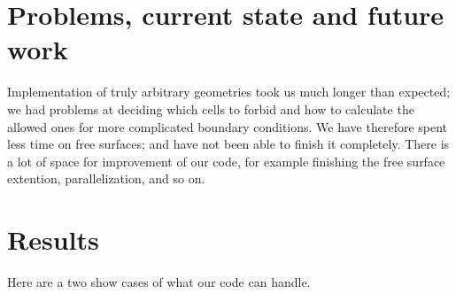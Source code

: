 \documentclass[a4paper, 12pt]{article}
\begin{document}
\section{Problems, current state and future work}\label{sec:prob_state_future}
Implementation of truly arbitrary geometries took us much longer than expected; we had problems at deciding which cells to forbid and how to calculate the 
allowed ones for more complicated boundary conditions. We have therefore spent less time on free surfaces; and have not been able to finish it completely.
There is a lot of space for improvement of our code, for example finishing the free surface extention, parallelization, and so on. 
 
\section{Results}\label{sec:results}
Here are a two show cases of what our code can handle.
\end{document}
